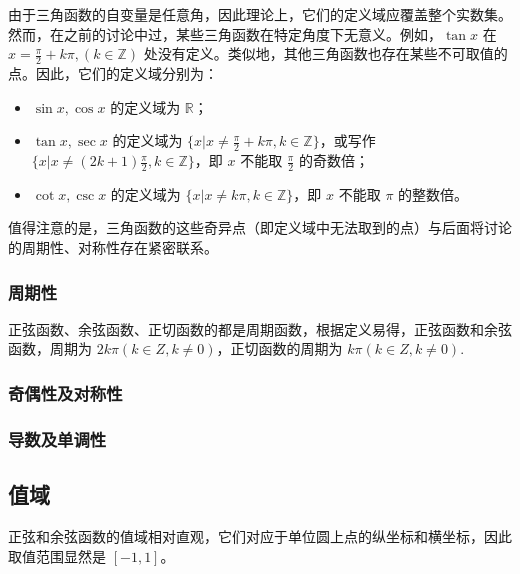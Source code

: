 由于三角函数的自变量是任意角，因此理论上，它们的定义域应覆盖整个实数集。然而，在之前的讨论中过，某些三角函数在特定角度下无意义。例如，$\tan x$ 在 $\displaystyle x=\frac{\pi}{2}+k\pi, (k\in\mathbb{Z})$ 处没有定义。类似地，其他三角函数也存在某些不可取值的点。因此，它们的定义域分别为：
\begin{itemize}
\item $\sin x,\cos x$ 的定义域为 $\mathbb{R}$；
\item $\tan x,\sec x$ 的定义域为 $\displaystyle\{x|x\neq\frac{\pi}{2}+k\pi,k\in\mathbb{Z}\}$，或写作$\displaystyle\{x|x\neq(2k+1)\frac{\pi}{2},k\in\mathbb{Z}\}$，即 $x$ 不能取 $\frac{\pi}{2}$ 的奇数倍；
\item $\cot x,\csc x$ 的定义域为 $\displaystyle\{x|x\neq k\pi,k\in\mathbb{Z}\}$，即 $x$ 不能取 $\pi$ 的整数倍。
\end{itemize}
值得注意的是，三角函数的这些奇异点（即定义域中无法取到的点）与后面将讨论的周期性、对称性存在紧密联系。

\subsubsection{周期性}

正弦函数、余弦函数、正切函数的都是周期函数，根据定义易得，正弦函数和余弦函数，周期为 $2k\pi(k\in Z,k\neq0)$，正切函数的周期为 $k\pi(k\in Z,k\neq0)$.


\subsubsection{奇偶性及对称性}

\subsubsection{导数及单调性}

\subsection{值域}

正弦和余弦函数的值域相对直观，它们对应于单位圆上点的纵坐标和横坐标，因此取值范围显然是 $[-1,1]$。

